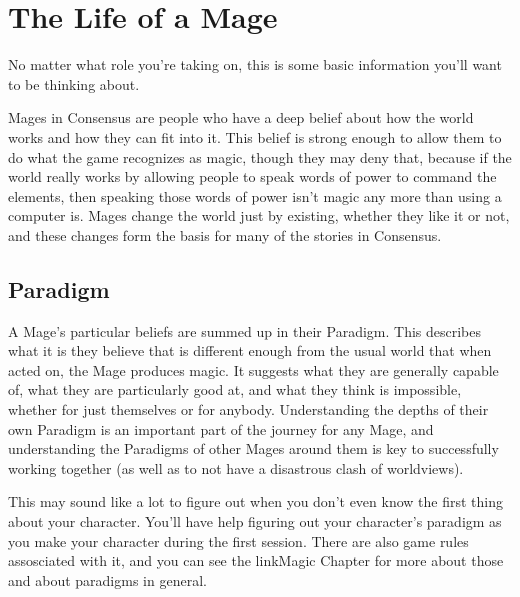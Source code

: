 \documentclass[
  oneside,
  statementpaper,
  9pt]{memoir}
\begin{document}
\hypertarget{the-life-of-a-mage}{%
\section{The Life of a Mage}\label{the-life-of-a-mage}}

\begin{Narrator}

No matter what role you're taking on, this is some basic information you'll want to be thinking about.

Mages in Consensus are people who have a deep belief about how the world works and how they can fit into it. This belief is strong enough to allow them to do what the game recognizes as magic, though they may deny that, because if the world really works by allowing people to speak words of power to command the elements, then speaking those words of power isn’t magic any more than using a computer is. Mages change the world just by existing, whether they like it or not, and these changes form the basis for many of the stories in Consensus.

\end{Narrator}

\hypertarget{paradigm}{%
\subsection{Paradigm}\label{paradigm}}

\begin{Narrator}

A Mage’s particular beliefs are summed up in their Paradigm. This describes what it is they believe that is different enough from the usual world that when acted on, the Mage produces magic. It suggests what they are generally capable of, what they are particularly good at, and what they think is impossible, whether for just themselves or for anybody. Understanding the depths of their own Paradigm is an important part of the journey for any Mage, and understanding the Paradigms of other Mages around them is key to successfully working together (as well as to not have a disastrous clash of worldviews).

\end{Narrator}

\begin{Player}

This may sound like a lot to figure out when you don't even know the first thing about your character. You'll have help figuring out your character's paradigm as you make your character during the first session. There are also game rules assosciated with it, and you can see the {{linkMagic Chapter}} for more about those and about paradigms in general.

\end{Player}
\end{document}
